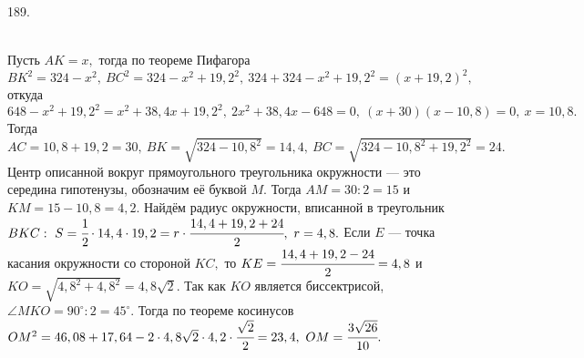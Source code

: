 189. \begin{figure}[ht!]
\end{figure}\\
Пусть $AK=x,$ тогда по теореме Пифагора $BK^2=324-x^2,\ BC^2=324-x^2+19,2^2,\ 324+324-x^2+19,2^2=(x+19,2)^2,$ откуда $648-x^2+19,2^2=x^2+38,4x+19,2^2,\
2x^2+38,4x-648=0,\ (x+30)(x-10,8)=0,\ x=10,8.$ Тогда $AC=10,8+19,2=30,\ BK=\sqrt{324-10,8^2}=14,4,\ BC=\sqrt{324-10,8^2+19,2^2}=24.$ Центр описанной вокруг прямоугольного треугольника окружности --- это середина гипотенузы, обозначим её буквой $M.$ Тогда $AM=30:2=15$ и $KM=15-10,8=4,2.$ Найдём радиус окружности, вписанной в треугольник $BKC:\ S=\cfrac{1}{2}\cdot14,4\cdot19,2=r\cdot\cfrac{14,4+19,2+24}{2},\ r=4,8.$ Если $E$ --- точка касания окружности со стороной $KC,$ то $KE=\cfrac{14,4+19,2-24}{2}=4,8$ и $KO=\sqrt{4,8^2+4,8^2}=4,8\sqrt{2}.$ Так как $KO$ является биссектрисой, $\angle MKO=90^\circ:2=45^\circ.$ Тогда по теореме косинусов $OM^2=46,08+17,64-2\cdot4,8\sqrt{2}\cdot4,2\cdot\cfrac{\sqrt{2}}{2}=23,4,\ OM=\cfrac{3\sqrt{26}}{10}.$\\
